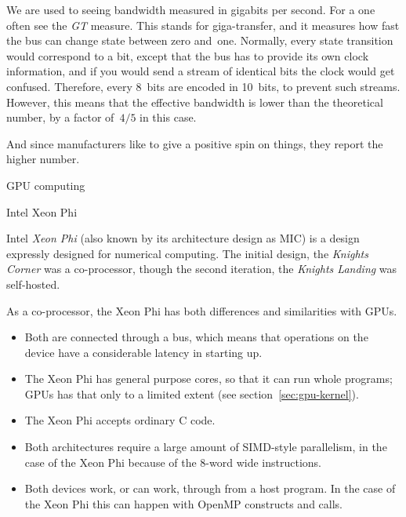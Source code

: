  We are used to seeing bandwidth
measured in gigabits per second. For a  one often
see the \emph{GT} measure. This stands
for giga-transfer, and it measures how fast the bus can change state
between zero and~one.
Normally, every state transition would correspond to a bit, except that
the bus has to provide its own clock information, and if you would send a stream
of identical bits the clock would get confused. Therefore, every 8~bits
are encoded in 10~bits, to prevent such streams. However, this means
that the effective bandwidth is lower than the theoretical number,
by a factor of~$4/5$ in this case.

And since manufacturers like to give a positive spin on things,
they report the higher number.

 {GPU computing}
\label{sec:gpu}


 {Intel Xeon Phi}

Intel \emph{Xeon Phi}
(also known by its architecture design as \ac{MIC})
is a design expressly designed for numerical computing.
The initial design, the
%
\emph{Knights Corner}%
was a co-processor, though the second iteration, the
\emph{Knights Landing}%
was self-hosted.

As a co-processor, the Xeon Phi has both differences and similarities with \acp{GPU}.
\begin{itemize}
\item Both are connected through a  bus, which means
  that operations on the device have a considerable latency in
  starting up.
\item The Xeon Phi has general purpose cores, so that it can run whole
  programs; \acp{GPU} has that only to a limited extent (see
  section~\ref{sec:gpu-kernel}).
\item The Xeon Phi accepts ordinary C code.
\item Both architectures require a large amount of SIMD-style
  parallelism, in the case of the Xeon Phi because of the 8-word wide
   instructions.
\item Both devices work, or can work, through 
  from a host program. In the case of the Xeon Phi this can happen
  with OpenMP constructs and  calls.
\end{itemize}

